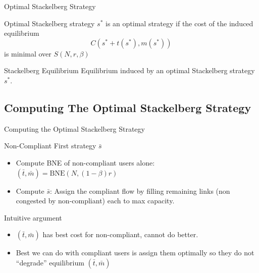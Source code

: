 \documentclass[xcolor=svgnames, english, smaller]{beamer}
\theoremstyle{plain}
\theoremstyle{definition}
\theoremstyle{plain}
\theoremstyle{plain}
\begin{document}
\begin{frame}{Optimal Stackelberg Strategy}

\begin{block}{Optimal Stackelberg strategy}
$s^*$ is an optimal strategy if the cost of the induced equilibrium
\[
C(s^* + t(s^*), m(s^*))
\]
is minimal over $S(N, r, \beta)$
\end{block}



\begin{block}{Stackelberg Equilibrium}
Equilibrium induced by an optimal Stackelberg strategy $s^*$.
\end{block}

\end{frame}


\subsection{Computing The Optimal Stackelberg Strategy}

\begin{frame}{Computing the Optimal Stackelberg Strategy}

\begin{block}{Non-Compliant First strategy $\bar{s}$}
\begin{itemize}
\item Compute BNE of non-compliant users alone: $(\bar{t}, \bar{m}) = \text{BNE}(N, (1-\beta)r)$
\item Compute $\bar{s}$: Assign the compliant flow by filling remaining links (non congested by non-compliant) each to max capacity.
\end{itemize}
\end{block}

\pause 
Intuitive argument
\begin{itemize}
\item $(\bar{t}, \bar{m})$ has best cost for non-compliant, cannot do better.
\item Best we can do with compliant users is assign them optimally so they do not ``degrade'' equilibrium $(\bar{t}, \bar{m})$
\end{itemize}


\end{frame}
\end{document}

